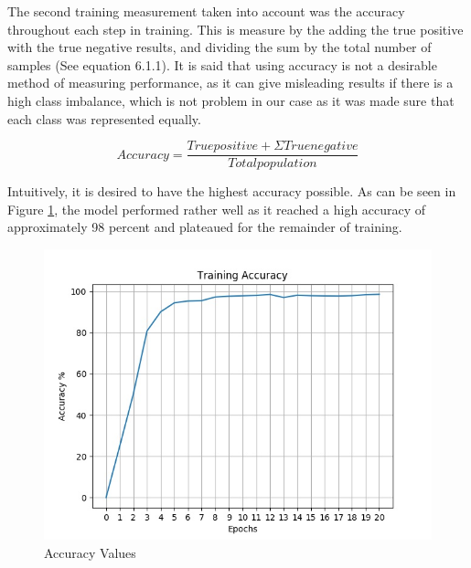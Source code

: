 \newpage

The second training measurement taken into account was the accuracy throughout each step in training. This is measure by the adding the true positive with the true negative results, and dividing the sum by the total number of samples (See equation 6.1.1). It is said that using accuracy is not a desirable method of measuring performance, as it can give misleading results if there is a high class imbalance, which is not problem in our case as it was made sure that each class was represented equally.

\begin{equation}\label{eq:ac}
Accuracy = 
\frac{
True positive + Σ True negative
}{
Total population
}
\end{equation}

Intuitively, it is desired to have the highest accuracy possible. As can be seen in Figure \ref{acc}, the model performed rather well as it reached a high accuracy of approximately 98 percent and plateaued for the remainder of training.
\begin{figure}[ht]
	\begin{center}
		\advance\leftskip-3cm
		\advance\rightskip-3cm
		\includegraphics[keepaspectratio=true,scale=0.7]{__resources/Results/accuracy.jpg}
		\caption{Accuracy Values}
		\label{acc}
	\end{center}
\end{figure}

\newpage
